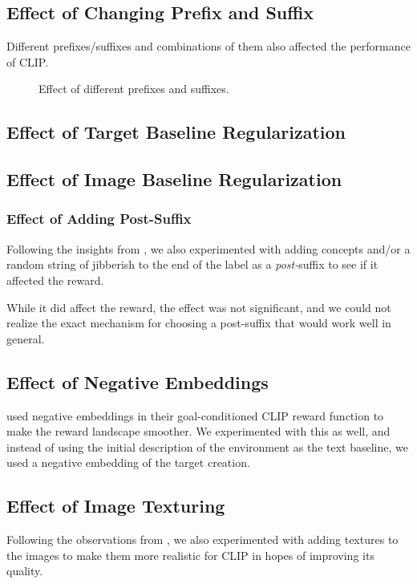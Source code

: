 \subsection{Effect of Changing Prefix and Suffix}
\label{sec:prefix-suffix}
Different prefixes/suffixes and combinations of them also affected the performance of CLIP.

\begin{figure}[H]
    \centering
    \caption{Effect of different prefixes and suffixes.}
    \label{fig:prefix-suffix}
\end{figure}


\subsection{Effect of Target Baseline Regularization}
\label{sec:reg-alpha}


\subsection{Effect of Image Baseline Regularization}
\label{sec:reg-beta}


\subsubsection{Effect of Adding Post-Suffix}
\label{sec:post-suffix}
Following the insights from \cite{waffleclip}, we also experimented with adding concepts and/or a random string of jibberish to the end of the label as a \emph{post-}suffix to see if it affected the reward. 

While it did affect the reward, the effect was not significant, and we could not realize the exact mechanism for choosing a post-suffix that would work well in general.


\subsection{Effect of Negative Embeddings}
\label{sec:negative-embeddings}
\cite{negprompt} used negative embeddings in their goal-conditioned CLIP reward function to make the reward landscape smoother.
We experimented with this as well, and instead of using the initial description of the environment as the text baseline, we used a negative embedding of the target creation.


\subsection{Effect of Image Texturing}
\label{sec:image-texturing}
Following the observations from \cite{vlmrm}, we also experimented with adding textures to the images to make them more realistic for CLIP in hopes of improving its quality.


